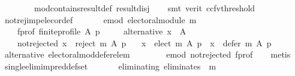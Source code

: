 \begin{isabellebody}
\ \ \ \ \ \ \ \ mod{\isacharunderscore}{\kern0pt}contains{\isacharunderscore}{\kern0pt}result{\isacharunderscore}{\kern0pt}def\ result{\isacharunderscore}{\kern0pt}disj\isanewline
\ \ \isamarkupfalse%
\ {\isacharparenleft}{\kern0pt}smt\ {\isacharparenleft}{\kern0pt}verit{\isacharcomma}{\kern0pt}\ ccfv{\isacharunderscore}{\kern0pt}threshold{\isacharparenright}{\kern0pt}{\isacharparenright}{\kern0pt}%
\endisatagproof
{\isafoldproof}%
%
\isadelimproof
\isanewline
%
\endisadelimproof
\isanewline
{}\isamarkupfalse%
\ not{\isacharunderscore}{\kern0pt}rej{\isacharunderscore}{\kern0pt}imp{\isacharunderscore}{\kern0pt}elec{\isacharunderscore}{\kern0pt}or{\isacharunderscore}{\kern0pt}def{\isacharcolon}{\kern0pt}\isanewline
\ \ \isanewline
\ \ \ \ e{\isacharunderscore}{\kern0pt}mod{\isacharcolon}{\kern0pt}\ {\isachardoublequoteopen}electoral{\isacharunderscore}{\kern0pt}module\ m{\isachardoublequoteclose}\ \isanewline
\ \ \ \ f{\isacharunderscore}{\kern0pt}prof{\isacharcolon}{\kern0pt}\ {\isachardoublequoteopen}finite{\isacharunderscore}{\kern0pt}profile\ A\ p{\isachardoublequoteclose}\ \isanewline
\ \ \ \ alternative{\isacharcolon}{\kern0pt}\ {\isachardoublequoteopen}x\ {\isasymin}\ A{\isachardoublequoteclose}\ \isanewline
\ \ \ \ not{\isacharunderscore}{\kern0pt}rejected{\isacharcolon}{\kern0pt}\ {\isachardoublequoteopen}x\ {\isasymnotin}\ reject\ m\ A\ p{\isachardoublequoteclose}\isanewline
\ \ \ {\isachardoublequoteopen}x\ {\isasymin}\ elect\ m\ A\ p\ {\isasymor}\ x\ {\isasymin}\ defer\ m\ A\ p{\isachardoublequoteclose}\isanewline
%
\isadelimproof
\ \ %
\endisadelimproof
%
\isatagproof
{}\isamarkupfalse%
\ alternative\ electoral{\isacharunderscore}{\kern0pt}mod{\isacharunderscore}{\kern0pt}defer{\isacharunderscore}{\kern0pt}elem\isanewline
\ \ \ \ \ \ \ \ e{\isacharunderscore}{\kern0pt}mod\ not{\isacharunderscore}{\kern0pt}rejected\ f{\isacharunderscore}{\kern0pt}prof\isanewline
\ \ \isamarkupfalse%
\ metis%
\endisatagproof
{\isafoldproof}%
%
\isadelimproof
\isanewline
%
\endisadelimproof
\isanewline
{}\isamarkupfalse%
\ single{\isacharunderscore}{\kern0pt}elim{\isacharunderscore}{\kern0pt}imp{\isacharunderscore}{\kern0pt}red{\isacharunderscore}{\kern0pt}def{\isacharunderscore}{\kern0pt}set{\isacharcolon}{\kern0pt}\isanewline
\ \ \isanewline
\ \ \ \ eliminating{\isacharcolon}{\kern0pt}\ {\isachardoublequoteopen}eliminates\ {}\ m{\isachardoublequoteclose}\ \isanewline

\end{isabellebody}
